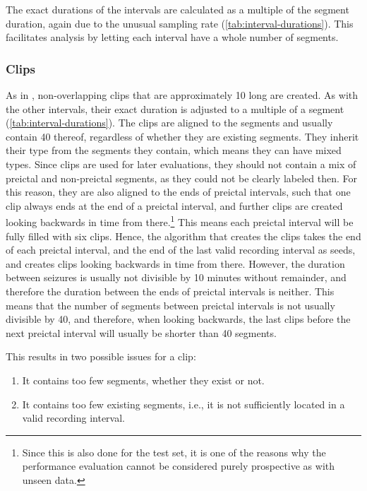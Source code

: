 The exact durations of the intervals are calculated as a multiple of the segment duration, again due to the unusual sampling rate (\cref{tab:interval-durations}). This facilitates analysis by letting each interval have a whole number of segments.

\begin{table}[!htbp]
    \centering
    \caption[Interval Durations]{The approximate and exact durations of the defined intervals, as multiples of segments.}
    \label{tab:interval-durations}
    
\end{table}

\subsubsection{Clips}
As in \textcite{yang_seizure_2024}, non-overlapping clips that are approximately \SI{10}{\min} long are created.
As with the other intervals, their exact duration is adjusted to a multiple of a segment (\cref{tab:interval-durations}).
The clips are aligned to the segments and usually contain 40 thereof, regardless of whether they are existing segments.
They inherit their type from the segments they contain, which means they can have mixed types.
Since clips are used for later evaluations, they should not contain a mix of preictal and non-preictal segments, as they could not be clearly labeled then.
For this reason, they are also aligned to the ends of preictal intervals, such that one clip always ends at the end of a preictal interval, and further clips are created looking backwards in time from there.\footnote{Since this is also done for the test set, it is one of the reasons why the performance evaluation cannot be considered purely prospective as with unseen data.}
This means each preictal interval will be fully filled with six clips.
Hence, the algorithm that creates the clips takes the end of each preictal interval, and the end of the last valid recording interval as seeds, and creates clips looking backwards in time from there.
However, the duration between seizures is usually not divisible by 10 minutes without remainder, and therefore the duration between the ends of preictal intervals is neither.
This means that the number of segments between preictal intervals is not usually divisible by 40, and therefore, when looking backwards, the last clips before the next preictal interval will usually be shorter than 40 segments.

This results in two possible issues for a clip:
\begin{enumerate}
    \item It contains too few segments, whether they exist or not.
    \item It contains too few existing segments, i.e., it is not sufficiently located in a valid recording interval.
\end{enumerate}

